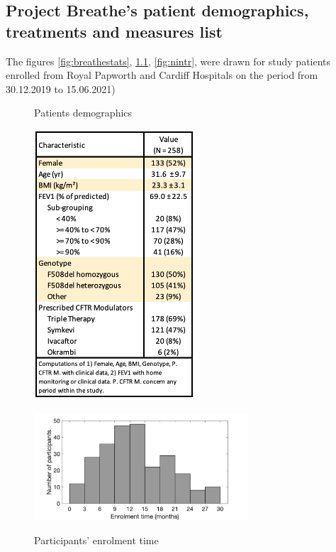 \begin{appendices}

\chapter{Project Breathe's patient demographics, treatments and measures list} \label{sec:appendixbreathe}
The figures \ref{fig:breathestats}, \ref{fig:enrolmenttime}, \ref{fig:nintr}, were drawn for study patients enrolled from Royal Papworth and Cardiff Hospitals on the period from 30.12.2019 to 15.06.2021)

\begin{figure}[!h]
   \begin{minipage}{0.48\textwidth}
     \caption{Patients demographics}
    \centering
    \includegraphics[width=60mm]{images/breathestats.png}
    \label{fig:breathestats}
   \end{minipage}\hfill
   \begin{minipage}{0.48\textwidth}
   
     \caption{Participants' enrolment time}
    \centering
    \includegraphics[width=80mm]{images/Patient_enrolment_time_from30-Dec-2019_to15-Jun-2021.png}
    \label{fig:enrolmenttime}
    

\end{minipage}
\end{figure}
\end{appendices}
